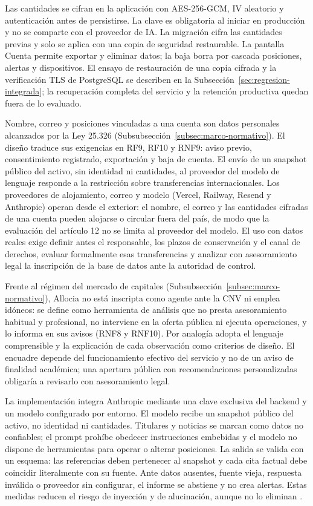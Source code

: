 Las cantidades se cifran en la aplicación con AES-256-GCM, IV aleatorio y autenticación antes de persistirse. La clave es obligatoria al iniciar en producción y no se comparte con el proveedor de IA. La migración cifra las cantidades previas y solo se aplica con una copia de seguridad restaurable. La pantalla Cuenta permite exportar y eliminar datos; la baja borra por cascada posiciones, alertas y dispositivos. El ensayo de restauración de una copia cifrada y la verificación TLS de PostgreSQL se describen en la Subsección~\ref{sec:regresion-integrada}; la recuperación completa del servicio y la retención productiva quedan fuera de lo evaluado.

Nombre, correo y posiciones vinculadas a una cuenta son datos personales alcanzados por la Ley 25.326 (Subsubsección~\ref{subsec:marco-normativo}). El diseño traduce sus exigencias en RF9, RF10 y RNF9: aviso previo, consentimiento registrado, exportación y baja de cuenta. El envío de un snapshot público del activo, sin identidad ni cantidades, al proveedor del modelo de lenguaje responde a la restricción sobre transferencias internacionales. Los proveedores de alojamiento, correo y modelo (Vercel, Railway, Resend y Anthropic) operan desde el exterior: el nombre, el correo y las cantidades cifradas de una cuenta pueden alojarse o circular fuera del país, de modo que la evaluación del artículo 12 no se limita al proveedor del modelo. El uso con datos reales exige definir antes el responsable, los plazos de conservación y el canal de derechos, evaluar formalmente esas transferencias y analizar con asesoramiento legal la inscripción de la base de datos ante la autoridad de control.

Frente al régimen del mercado de capitales (Subsubsección~\ref{subsec:marco-normativo}), Allocia no está inscripta como agente ante la CNV ni emplea idóneos: se define como herramienta de análisis que no presta asesoramiento habitual y profesional, no interviene en la oferta pública ni ejecuta operaciones, y lo informa en sus avisos (RNF8 y RNF10). Por analogía adopta el lenguaje comprensible y la explicación de cada observación como criterios de diseño. El encuadre depende del funcionamiento efectivo del servicio y no de un aviso de finalidad académica; una apertura pública con recomendaciones personalizadas obligaría a revisarlo con asesoramiento legal.

La implementación integra Anthropic mediante una clave exclusiva del backend y un modelo configurado por entorno. El modelo recibe un snapshot público del activo, no identidad ni cantidades. Titulares y noticias se marcan como datos no confiables; el prompt prohíbe obedecer instrucciones embebidas y el modelo no dispone de herramientas para operar o alterar posiciones. La salida se valida con un esquema: las referencias deben pertenecer al snapshot y cada cita factual debe coincidir literalmente con su fuente. Ante datos ausentes, fuente vieja, respuesta inválida o proveedor sin configurar, el informe se abstiene y no crea alertas. Estas medidas reducen el riesgo de inyección y de alucinación, aunque no lo eliminan \parencite{OWASPPromptInjection}.

